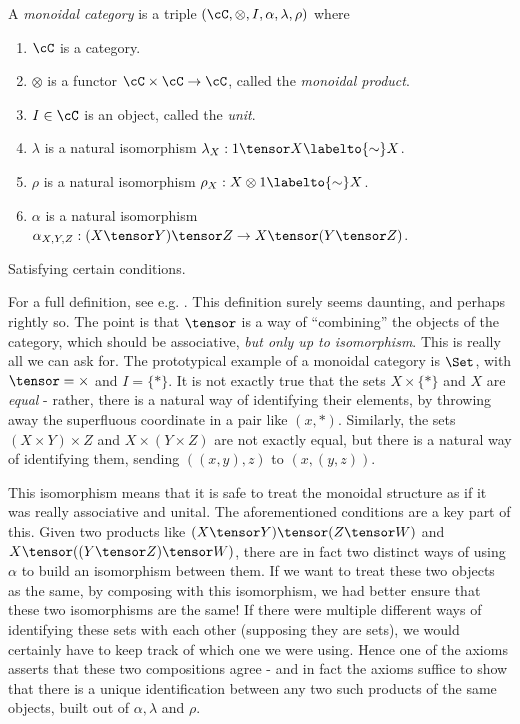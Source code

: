 \documentclass{article}
\begin{document}
\begin{definition}
A \emph{monoidal category} is a triple $(\cC, \otimes, I, \alpha, \lambda, \rho)$ where
    \begin{enumerate}
        \item $\cC$ is a category.
        \item $\otimes$ is a functor $\cC \times \cC \to \cC$, called the \emph{monoidal product}.
        \item $I \in \cC$ is an object, called the \emph{unit}.
        \item $\lambda$ is a natural isomorphism $\lambda_X: 1 \tensor X \labelto{\sim} X$.
        \item $\rho$ is a natural isomorphism $\rho_X: X \otimes 1 \labelto{\sim} X$.
        \item $\alpha$ is a natural isomorphism $\alpha_{X,Y,Z}: (X \tensor Y) \tensor Z \to X \tensor (Y \tensor Z)$.
    \end{enumerate}
    Satisfying certain conditions.
\end{definition}
For a full definition, see e.g. .
This definition surely seems daunting, and perhaps rightly so.
The point is that $\tensor$ is a way of ``combining'' the objects of the category, which should be associative, \emph{but only up to isomorphism}.
This is really all we can ask for. The prototypical example of a monoidal category is $\Set$, with $\tensor = \times$ and $I = \{*\}$.
It is not exactly true that the sets $X \times \{*\}$ and $X$ are \emph{equal} - rather, there is a natural way of identifying their elements, by throwing away the superfluous coordinate in a pair like $(x,*)$.
Similarly, the sets $(X \times Y) \times Z$ and $X \times (Y \times Z)$ are not exactly equal, but there is a natural way of identifying them, sending $((x,y),z)$ to $(x,(y,z))$.

This isomorphism means that it is safe to treat the monoidal structure as if it was really associative and unital.
The aforementioned conditions are a key part of this.
Given two products like $(X \tensor Y) \tensor (Z \tensor W)$ and $X \tensor ((Y \tensor Z) \tensor W)$, there are in fact two distinct ways of using $\alpha$ to build an isomorphism between them. If we want to treat these two objects as the same, by composing with this isomorphism, we had better ensure that these two isomorphisms are the same! If there were multiple different ways of identifying these sets with each other (supposing they are sets), we would certainly have to keep track of which one we were using.\footnotemark
Hence one of the axioms asserts that these two compositions agree - and in fact the axioms suffice to show that there is a unique identification between any two such products of the same objects, built out of $\alpha, \lambda$ and $\rho$.
\end{document}
